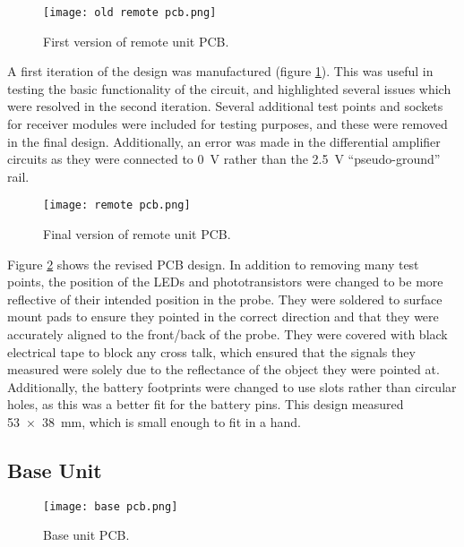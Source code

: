 \begin{figure}[htb]
	\centering
	\texttt{[image: old remote pcb.png]}
	\caption{First version of remote unit PCB.}
	\label{fig: old remote pcb}
\end{figure}

A first iteration of the design was manufactured (figure \ref{fig: old remote pcb}). This was useful in testing the basic functionality of the circuit, and highlighted several issues which were resolved in the second iteration. Several additional test points and sockets for receiver modules were included for testing purposes, and these were removed in the final design. Additionally, an error was made in the differential amplifier circuits as they were connected to \SI{0}{\volt} rather than the \SI{2.5}{\volt} ``pseudo-ground'' rail. \\



\begin{figure}[htb]
	\centering
	\texttt{[image: remote pcb.png]}
	\caption{Final version of remote unit PCB.}
	\label{fig: remote pcb}
\end{figure}

Figure \ref{fig: remote pcb} shows the revised PCB design. In addition to removing many test points, the position of the LEDs and phototransistors were changed to be more reflective of their intended position in the probe. They were soldered to surface mount pads to ensure they pointed in the correct direction and that they were accurately aligned to the front/back of the probe. They were covered with black electrical tape to block any cross talk, which ensured that the signals they measured were solely due to the reflectance of the object they were pointed at. Additionally, the battery footprints were changed to use slots rather than circular holes, as this was a better fit for the battery pins. This design measured \SI{53x38}{\milli\metre}, which is small enough to fit in a hand.\\






\subsection{Base Unit}

\begin{figure}[htb]
	\centering
	\texttt{[image: base pcb.png]}
	\caption{Base unit PCB.}
	\label{fig: base pcb}
\end{figure}


